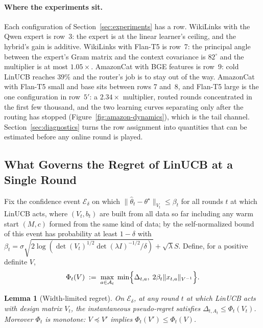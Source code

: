 \documentclass{article}
\newtheorem{lemma}{Lemma}
\theoremstyle{definition}
\theoremstyle{remark}
\theoremstyle{remark}
\begin{document}
\paragraph{Where the experiments sit.}
Each configuration of Section~\ref{sec:experiments} has a row. WikiLinks with
the Qwen expert is row~3: the expert is at the linear learner's ceiling, and
the hybrid's gain is additive. WikiLinks with Flan-T5 is row~7: the principal
angle between the expert's Gram matrix and the context covariance is
$82^\circ$ and the multiplier is at most $1.05\times$. AmazonCat with BGE
features is row~9: cold LinUCB reaches $39\%$ and the router's job is to stay
out of the way. AmazonCat with Flan-T5 small and base sits between rows 7
and~8, and Flan-T5 large is the one configuration in row~$5'$: a
$2.34\times$ multiplier, routed rounds concentrated in the first few
thousand, and the two learning curves separating only after the routing has
stopped (Figure~\ref{fig:amazon-dynamics}), which is the tail channel. Section~\ref{sec:diagnostics} turns the row assignment into
quantities that can be estimated before any online round is played.



\subsection{What Governs the Regret of LinUCB at a Single Round}
\label{sec:width}

Fix the confidence event $\mathcal E_\delta$ on which
$\|\widehat\theta_t-\theta^\star\|_{V_t}\le\beta_t$ for all rounds $t$ at
which LinUCB acts, where $(V_t,b_t)$ are built from all data so far including
any warm start $(M,c)$ formed from the same kind of data; by the
self-normalized bound of \cite{abbasi2011improved} this event has probability
at least $1-\delta$ with
$\beta_t=\sigma\sqrt{2\log(\det(V_t)^{1/2}\det(\lambda I)^{-1/2}/\delta)}+\sqrt\lambda S$.
Define, for a positive definite $V$,
\begin{equation}
\label{eq:phi}
\Phi_t(V)\;:=\;\max_{a\in\mathcal A_t}\;\min\Bigl\{\Delta_{t,a},\;2\beta_t\|x_{t,a}\|_{V^{-1}}\Bigr\}.
\end{equation}

\begin{lemma}[Width-limited regret]
\label{lem:width-limited}
On $\mathcal E_\delta$, at any round $t$ at which LinUCB acts with design
matrix $V_t$, the instantaneous pseudo-regret satisfies
$\Delta_{t,A_t}\le\Phi_t(V_t)$. Moreover $\Phi_t$ is monotone: $V\preceq V'$
implies $\Phi_t(V')\le\Phi_t(V)$.
\end{lemma}
\end{document}
